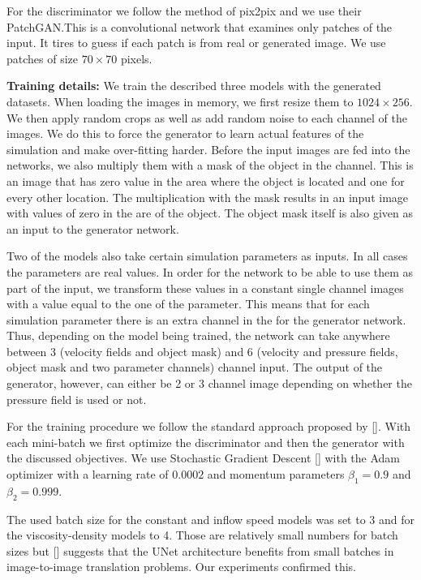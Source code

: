 \documentclass{llncs}
\begin{document}
For the discriminator we follow the method of pix2pix and we use their PatchGAN.\@ This is a convolutional network that examines only patches of the input. It tires to guess if each patch is from real or generated image. We use patches of size $70\times 70$ pixels.

\noindent\textbf{Training details:} We train the described three models with the generated datasets. When loading the images in memory, we first resize them to $1024\times 256$. We then apply random crops as well as add random noise to each channel of the images. We do this to force the generator to learn actual features of the simulation and make over-fitting harder. Before the input images are fed into the networks, we also multiply them with a mask of the object in the channel. This is an image that has zero value in the area where the object is located and one for every other location. The multiplication with the mask results in an input image with values of zero in the are of the object. The object mask itself is also given as an input to the generator network.

Two of the models also take certain simulation parameters as inputs. In all cases the parameters are real values. In order for the network to be able to use them as part of the input, we transform these values in a constant single channel images with a value equal to the one of the parameter. This means that for each simulation parameter there is an extra channel in the for the generator network. Thus, depending on the model being trained, the network can take anywhere between 3 (velocity fields and object mask) and 6 (velocity and pressure fields, object mask and two parameter channels) channel input. The output of the generator, however, can either be 2 or 3 channel image depending on whether the pressure field is used or not.

For the training procedure we follow the standard approach proposed by []. With each mini-batch we first optimize the discriminator and then the generator with the discussed objectives. We use Stochastic Gradient Descent [] with the Adam optimizer with a learning rate of $0.0002$ and momentum parameters $\beta_1=0.9$ and $\beta_2=0.999$.

The used batch size for the constant and inflow speed models was set to 3 and for the viscosity-density models to 4. Those are relatively small numbers for batch sizes but [] suggests that the UNet architecture benefits from small batches in image-to-image translation problems. Our experiments confirmed this.
\end{document}
